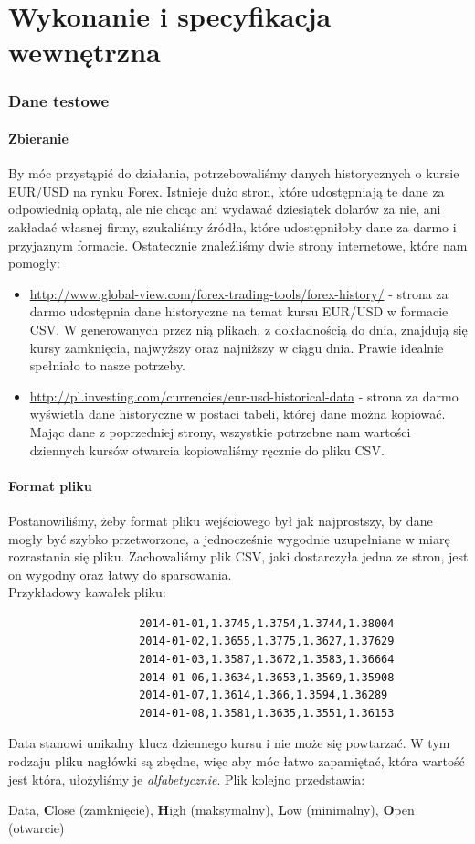 \documentclass[a4paper]{article}
\begin{document}
	\part{Wykonanie i specyfikacja wewnętrzna}
		\section{Dane testowe}
			\subsection{Zbieranie}\indent\indent
				By móc przystąpić do działania, potrzebowaliśmy danych historycznych o kursie EUR/USD na rynku Forex. Istnieje dużo stron, które udostępniają te dane za odpowiednią opłatą, ale nie chcąc ani wydawać dziesiątek dolarów za nie, ani zakładać własnej firmy, szukaliśmy źródła, które udostępniłoby dane za darmo i przyjaznym formacie. Ostatecznie znaleźliśmy dwie strony internetowe, które nam pomogły:
				\begin{itemize}
					\item \url{http://www.global-view.com/forex-trading-tools/forex-history/} - strona za darmo udostępnia dane historyczne na temat kursu EUR/USD w formacie CSV. W generowanych przez nią plikach, z dokładnością do dnia, znajdują się kursy zamknięcia, najwyższy oraz najniższy w ciągu dnia. Prawie idealnie spełniało to nasze potrzeby.
					\item \url{http://pl.investing.com/currencies/eur-usd-historical-data} - strona za darmo wyświetla dane historyczne w postaci tabeli, której dane można kopiować. Mając dane z poprzedniej strony, wszystkie potrzebne nam wartości dziennych kursów otwarcia kopiowaliśmy ręcznie do pliku CSV.
				\end{itemize}
			\subsection{Format pliku}\label{subsec:format}\indent\indent
				Postanowiliśmy, żeby format pliku wejściowego był jak najprostszy, by dane mogły być szybko przetworzone, a jednocześnie wygodnie uzupełniane w miarę rozrastania się pliku. Zachowaliśmy plik CSV, jaki dostarczyła jedna ze stron, jest on wygodny oraz łatwy do sparsowania.\\
				Przykładowy kawałek pliku:
				\begin{lstlisting}
					2014-01-01,1.3745,1.3754,1.3744,1.38004
					2014-01-02,1.3655,1.3775,1.3627,1.37629
					2014-01-03,1.3587,1.3672,1.3583,1.36664
					2014-01-06,1.3634,1.3653,1.3569,1.35908
					2014-01-07,1.3614,1.366,1.3594,1.36289
					2014-01-08,1.3581,1.3635,1.3551,1.36153
				\end{lstlisting}
				Data stanowi unikalny klucz dziennego kursu i nie może się powtarzać. W tym rodzaju pliku nagłówki są zbędne, więc aby móc łatwo zapamiętać, która wartość jest która, ułożyliśmy je \textit{alfabetycznie}. Plik kolejno przedstawia:
				\begin{center}
					Data, \textbf{C}lose (zamknięcie), \textbf{H}igh (maksymalny), \textbf{L}ow (minimalny), \textbf{O}pen (otwarcie)
				\end{center}
\end{document}
